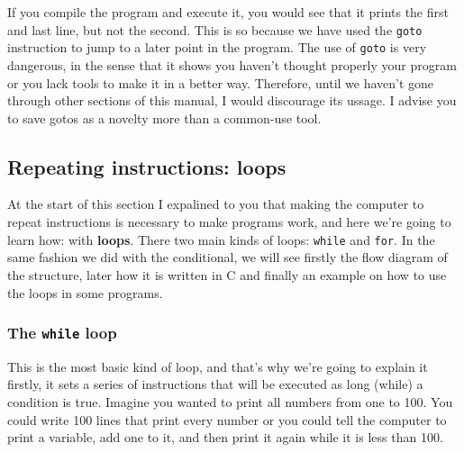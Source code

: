 \documentclass[a4paper]{article}
\begin{document}
If you compile the program and execute it, you would see that it prints the
first and last line, but not the second. This is so because we have used the
\texttt{goto} instruction to jump to a later point in the program. The use
of \texttt{goto} is very dangerous, in the sense that it shows you haven't
thought properly your program or you lack tools to make it in a better way.
Therefore, until we haven't gone through other sections of this manual, I
would discourage its ussage. I advise you to save gotos as a novelty more
than a common-use tool.

\subsection{Repeating instructions: loops}
At the start of this section I expalined to you that making the computer to
repeat instructions is necessary to make programs work, and here we're going
to learn how: with \textbf{loops}. There two main kinds of loops:
\lstinline[style=C]!while! and \lstinline[style=C]!for!.
In the same fashion we did with the conditional, we will see firstly the flow
diagram of the structure, later how it is written in C and finally an example on
how to use the loops in some programs.

\subsubsection{The \texttt{while} loop}
This is the most basic kind of loop, and that's why we're going to explain it
firstly, it sets a series of instructions that will be executed as long
(while) a condition is true. Imagine you wanted to print all numbers from
one to 100. You could write 100 lines that print every number or you could
tell the computer to print a variable, add one to it, and then print it again
while it is less than 100.
\end{document}
